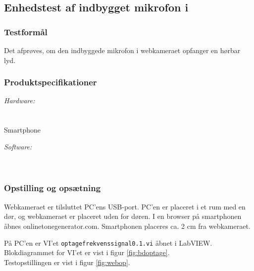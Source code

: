 	\subsection{Enhedstest af indbygget mikrofon i \webcammic}
		\subsubsection{Testformål}
		Det afprøves, om den indbyggede mikrofon i webkameraet opfanger en hørbar lyd. 
		
		\subsubsection{Produktspecifikationer}
	
			\textit{Hardware:}\\
			\webcammic\\
			\PC\\
			Smartphone
	
			\textit{Software:}\\
			\labview\\
			\onlineg\\
	
		\subsubsection{Opstilling og opsætning}
		Webkameraet er tilsluttet PC'ens USB-port. PC'en er placeret i et rum med en dør, og webkameraet er placeret uden for døren. I en browser på smartphonen åbnes onlinetonegenerator.com. Smartphonen placeres ca. 2 cm fra webkameraet.  
			
			På PC'en er VI'et \texttt{optagefrekvenssignal0.1.vi} åbnet i LabVIEW. Blokdiagrammet for VI'et er vist i figur \ref{fig:bdoptage}.   \\   
			
			Testopstillingen er vist i figur \ref{fig:webop}.\\ 
		
		
			
